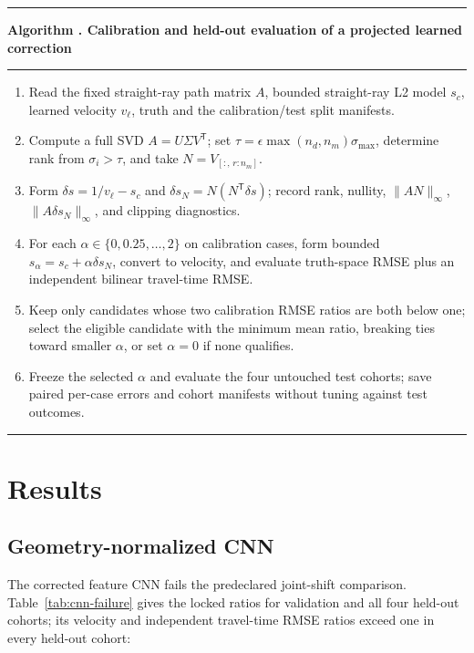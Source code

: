 \documentclass[11pt]{article}
\newcounter{algorithm}
\newenvironment{algorithm}[1]{%
  \refstepcounter{algorithm}%
  \begin{center}\begin{minipage}{0.96\textwidth}\hrule\vspace{5pt}%
  \textbf{Algorithm \thealgorithm. #1}\par\vspace{4pt}\hrule\vspace{4pt}%
}{\vspace{4pt}\hrule\end{minipage}\end{center}}
\begin{document}
\begin{algorithm}{Calibration and held-out evaluation of a projected learned correction}\label{alg:nullspace}
\begin{enumerate}
  \item Read the fixed straight-ray path matrix $A$, bounded straight-ray L2 model $s_c$, learned velocity $v_\ell$, truth and the calibration/test split manifests.
  \item Compute a full SVD $A=U\Sigma V^\mathsf{T}$; set $\tau=\epsilon\max(n_d,n_m)\sigma_{\max}$, determine rank from $\sigma_i>\tau$, and take $N=V_{[:,\,r:n_m]}$.
  \item Form $\delta s=1/v_\ell-s_c$ and $\delta s_N=N(N^\mathsf{T}\delta s)$; record rank, nullity, $\|AN\|_\infty$, $\|A\delta s_N\|_\infty$, and clipping diagnostics.
  \item For each $\alpha\in\{0,0.25,\ldots,2\}$ on calibration cases, form bounded $s_\alpha=s_c+\alpha\delta s_N$, convert to velocity, and evaluate truth-space RMSE plus an independent bilinear travel-time RMSE.
  \item Keep only candidates whose two calibration RMSE ratios are both below one; select the eligible candidate with the minimum mean ratio, breaking ties toward smaller $\alpha$, or set $\alpha=0$ if none qualifies.
  \item Freeze the selected $\alpha$ and evaluate the four untouched test cohorts; save paired per-case errors and cohort manifests without tuning against test outcomes.
\end{enumerate}
\end{algorithm}

\section{Results}
\subsection{Geometry-normalized CNN}
The corrected feature CNN fails the predeclared joint-shift comparison. Table~\ref{tab:cnn-failure} gives the locked ratios for validation and all four held-out cohorts; its velocity and independent travel-time RMSE ratios exceed one in every held-out cohort:
\end{document}

